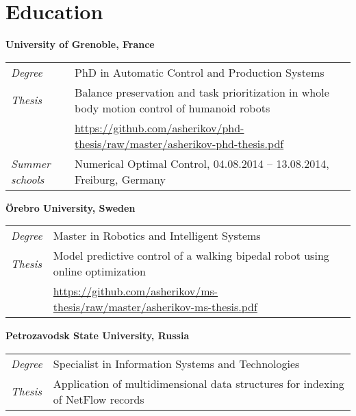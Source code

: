 \documentclass[a4paper,10pt]{report}
\begin{document}
\section{Education}
\begin{adjustwidth}{0.5cm}{0pt}
    {\bf {} University of Grenoble, France}\\
    \begin{tabularx}{\linewidth}{l X}
        {\it Degree}    & PhD in Automatic Control and Production Systems\\
        {\it Thesis}    &   Balance preservation and task prioritization in whole
                            body motion control of humanoid robots\\
                        &   \url{https://github.com/asherikov/phd-thesis/raw/master/asherikov-phd-thesis.pdf}\\
        \begin{minipage}{1cm}
            {\it Summer schools}
        \end{minipage}  & Numerical Optimal Control, 04.08.2014 -- 13.08.2014, Freiburg, Germany\\
    \end{tabularx}

    \vspace{0.15cm}

    {\bf {} \"Orebro University, Sweden}\\
    \begin{tabularx}{\linewidth}{l X}
        {\it Degree}    & Master in Robotics and Intelligent Systems\\
        {\it Thesis}    &   Model predictive control of a walking bipedal robot
                            using online optimization\\
                        &   \url{https://github.com/asherikov/ms-thesis/raw/master/asherikov-ms-thesis.pdf}\\
    \end{tabularx}

    \vspace{0.15cm}

    {\bf {} Petrozavodsk State University, Russia}\\
    \begin{tabularx}{\linewidth}{l X}
        {\it Degree}    & Specialist in Information Systems and Technologies\\
        {\it Thesis}    &   Application of multidimensional data structures
                            for indexing of NetFlow records\\
    \end{tabularx}
\end{adjustwidth}
\end{document}
